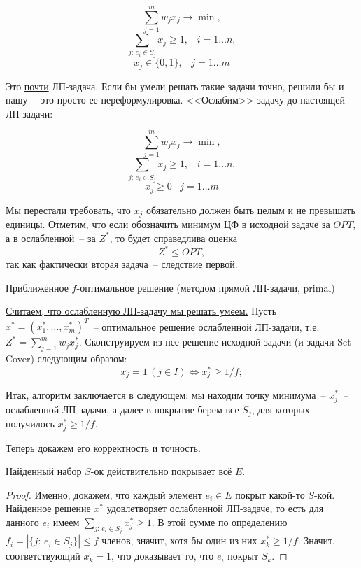 $$\sum_{j=1}^m w_j x_j \rightarrow \min,$$
$$\sum_{j:\, e_i \in S_j} x_j \geq 1, \;\;\; i=1\ldots n,$$
$$x_j \in \{0, 1\}, \;\;\; j=1\ldots m$$

Это \underline{почти} ЛП-задача. Если бы умели решать такие задачи точно, решили бы и нашу~-- это просто ее переформулировка. <<Ослабим>> задачу до настоящей ЛП-задачи:

$$\sum_{j=1}^m w_j x_j \rightarrow \min,$$
$$\sum_{j:\, e_i \in S_j} x_j \geq 1, \;\;\; i=1\ldots n,$$
$$x_j \geq 0 \;\;\; j=1\ldots m$$

Мы перестали требовать, что $x_j$ обязательно должен быть целым и не превышать единицы. Отметим, что если обозначить минимум ЦФ в исходной задаче за $OPT$, а в ослабленной~-- за $Z^*$, то будет справедлива оценка $$Z^* \leq OPT,$$ так как фактически вторая задача~-- следствие первой.

\begin{algodescription}{Приближенное $f$-оптимальное решение (методом прямой ЛП-задачи, primal)}

\underline{Считаем, что ослабленную ЛП-задачу мы решать умеем.} Пусть $x^* = (x_1^*, \ldots, x_m^*)^T$~-- оптимальное решение ослабленной ЛП-задачи, т.е. $Z^* = \sum\limits_{j=1}^m w_j x_j^*$. Сконструируем из нее решение исходной задачи (и задачи Set Cover) следующим образом:
$$x_j = 1\, (j \in I) \iff x_j^* \geq 1/f;$$

Итак, алгоритм заключается в следующем: мы находим точку минимума~-- $x_j^*$~-- ослабленной ЛП-задачи, а далее в покрытие берем все $S_j$, для которых получилось $x_j^* \geq 1/f$.
\end{algodescription}

Теперь докажем его корректность и точность.

\begin{theorem*}
    Найденный набор $S$-ок действительно покрывает всё $E$.
\end{theorem*}
\begin{proof}
    Именно, докажем, что каждый элемент $e_i \in E$ покрыт какой-то $S$-кой. Найденное решение $x^*$ удовлетворяет ослабленной ЛП-задаче, то есть для данного $e_i$ имеем $\sum\limits_{j: \, e_i \in S_j} x_j^* \geq 1$. В этой сумме по определению $f_i = \left|\{j: \, e_i \in S_j\}\right| \leq f$ членов, значит, хотя бы один из них $x_k^*\geq 1/f$. Значит, соответствующий $x_k = 1$, что доказывает то, что $e_i$ покрыт $S_k$.
\end{proof}

